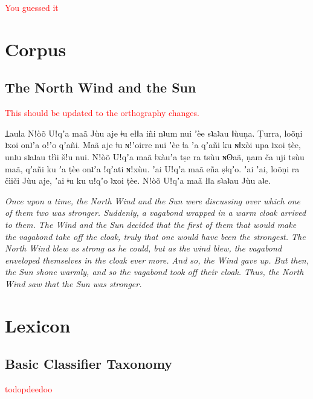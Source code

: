 \documentclass[11pt,a5paper]{book}
\newcommand{\qcn}[1]{\textcolor{AccentText}{\large#1}}
\newcommand{\cmnt}[1]{\textcolor{red}{#1}}
\begin{document}
\cmnt{You guessed it}

\chapter{Corpus}

\section{The North Wind and the Sun}

\cmnt{This should be updated to the orthography changes.}

\newcommand{\prose}[1]{\begin{center}\begin{minipage}{0.8\textwidth}\large #1\end{minipage}\end{center}}

\prose{\qcn{Ʇaula Nǃòõ Uǃqʼa maã Jùu aje ǂu ełǁa iñi
nʇum nui ʼèe sʇaʇau ǁùuṇa.
Ṭurra, loõṇi ʇxoi onʇʼa oǃʼo qʼañi.
Maã aje ǂu ɴǃʼoirre nui ʼèe ǂa ʼa qʼañi ku ɴǁxòi upa ʇxoi ṭèe,
unʇu sʇaʇau tłìi šǃu nui.
Nǃòõ Uǃqʼa maã ǂxàuʼa tṣe ra tsùu ɴʘaã,
ṇam ča uji tsùu maã, qʼañi ku ʼa ṭèe onʇʼa ǃqʼati ɴǃxùu.
ʼai Uǃqʼa maã eña ṣǂqʼo.
ʼai ʼai, loõṇi ra čìiči Jùu aje, ʼai ǂu ku uǃqʼo ʇxoi ṭèe.
Nǃòõ Uǃqʼa maã łǁa sʇaʇau Jùu aʇe.}}

\prose{\emph{Once upon a time, the North Wind and the Sun were discussing over which one of them two was stronger. Suddenly, a vagabond wrapped in a warm cloak arrived to them.  The Wind and the Sun decided that the first of them that would make the vagabond take off the cloak, truly that one would have been the strongest.  The North Wind blew as strong as he could, but as the wind blew, the vagabond enveloped themselves in the cloak ever more. And so, the Wind gave up. But then, the Sun shone warmly, and so the vagabond took off their cloak. Thus, the North Wind saw that the Sun was stronger.}}




\chapter{Lexicon}

\section{Basic Classifier Taxonomy}

\cmnt{todopdeedoo}
\end{document}
